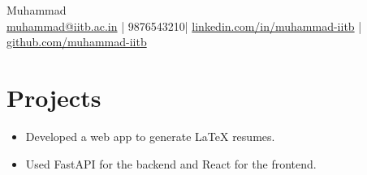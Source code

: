 \documentclass[a4paper,10pt]{article}
\makeatletter
\newcommand{\myname}{Muhammad}
\newcommand{\myemail}{muhammad@iitb.ac.in}
\newcommand{\myphone}{9876543210}
\newcommand{\mylinkedin}{linkedin.com/in/muhammad-iitb}
\newcommand{\mygithub}{github.com/muhammad-iitb}
\makeatother
\begin{document}
\begin{center}
    {\Huge \myname} \\ \vspace{2mm}
    \href{mailto:\myemail}{\myemail} | \myphone | \href{https://\mylinkedin}{\mylinkedin} | \href{https://\mygithub}{\mygithub}
\end{center}

\section*{Projects}
\begin{itemize}[leftmargin=*]
  \item Developed a web app to generate LaTeX resumes.
  \item Used FastAPI for the backend and React for the frontend.
\end{itemize}
\end{document}
